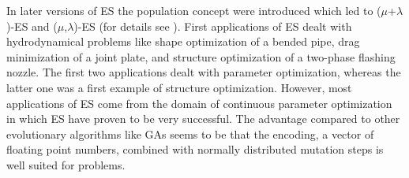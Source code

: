 
In later versions of ES the population concept were introduced which
led to ($\mu$+$\lambda$)-ES and ($\mu$,$\lambda$)-ES (for details see
). First applications
of ES dealt with hydrodynamical problems like shape optimization of a
bended pipe, drag minimization of a joint plate, and structure
optimization of a two-phase flashing nozzle. The first two
applications dealt with parameter optimization, whereas the latter one
was a first example of structure optimization.  However, most
applications of ES come from the domain of continuous parameter
optimization in which ES have proven to be very successful.  The
advantage compared to other evolutionary algorithms like GAs seems to
be that the encoding, a vector of floating point numbers, combined
with normally distributed mutation steps is well suited for  problems.
